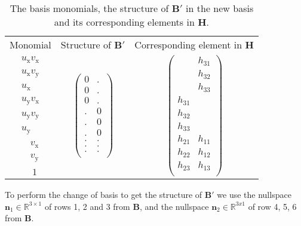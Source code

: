 \begin{table}[H]
\centering
\begin{tabular}{ c c c }
	Monomial & Structure of $\textbf{B}'$ & Corresponding element in $\textbf{H}$ \\
	$u_\mathrm{x} v_\mathrm{x}$ & \multirow{9}{*}{
$\begin{pmatrix}
	0 & . \\
	0 & . \\
	0 & . \\
	. & 0 \\
	. & 0 \\
	. & 0 \\
	. & . \\
	. & . \\
	. & . \\
\end{pmatrix}$
} & \multirow{9}{*}{
$\begin{pmatrix}
 & h_{31} \\
 & h_{32} \\
 & h_{33} \\
h_{31} &   \\
h_{32} &   \\
h_{33} &   \\
h_{21} & h_{11} \\
h_{22} & h_{12} \\
h_{23} & h_{13} \\
\end{pmatrix}$
} \\
	$u_\mathrm{x} v_\mathrm{y}$ & \\
	$u_\mathrm{x} \ \ \ \ $ & \\    
	\hline
	$u_\mathrm{y} v_\mathrm{x}$ & \\
	$u_\mathrm{y} v_\mathrm{y}$ & \\
	$u_\mathrm{y} \ \ \ \ $ & \\    
	\hline
	$\ \ \ \ v_\mathrm{x}$ & \\
	$\ \ \ \ v_\mathrm{y}$ & \\
	$\ \ \ \ 1$ & \\
\end{tabular}
\caption{The basis monomials, the structure of $\textbf{B}'$ in the new basis and its corresponding elements in $\textbf{H}$.}
\label{table:H}
\end{table}

To perform the change of basis to get the structure of $\textbf{B}'$ we use the nullspace $\textbf{n}_1 \in \mathbb{R}^{3\times 1}$ of rows 1, 2 and 3 from $\textbf{B}$, and the nullspace $\textbf{n}_2 \in \mathbb{R}^{3x1}$ of row 4, 5, 6 from $\textbf{B}$.

